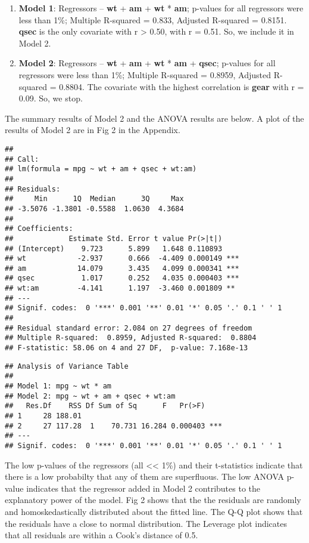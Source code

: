 \documentclass[10pt,]{article}
\begin{document}
\begin{enumerate}
\def\labelenumi{\arabic{enumi}.}
\itemsep1pt\parskip0pt
\item
  \textbf{Model 1}: Regressors -- \textbf{wt} + \textbf{am} +
  \textbf{wt} * \textbf{am}; p-values for all regressors were less than
  1\%; Multiple R-squared = 0.833, Adjusted R-squared = 0.8151.
  \textbf{qsec} is the only covariate with \textbar{}r\textbar{}
  \textgreater{} 0.50, with r = 0.51. So, we include it in Model 2.
\item
  \textbf{Model 2}: Regressors -- \textbf{wt} + \textbf{am} +
  \textbf{wt} * \textbf{am} + \textbf{qsec}; p-values for all regressors
  were less than 1\%; Multiple R-squared = 0.8959, Adjusted R-squared =
  0.8804. The covariate with the highest correlation is \textbf{gear}
  with r = 0.09. So, we stop.
\end{enumerate}

The summary results of Model 2 and the ANOVA results are below. A plot
of the results of Model 2 are in Fig 2 in the Appendix.

\begin{verbatim}
## 
## Call:
## lm(formula = mpg ~ wt + am + qsec + wt:am)
## 
## Residuals:
##     Min      1Q  Median      3Q     Max 
## -3.5076 -1.3801 -0.5588  1.0630  4.3684 
## 
## Coefficients:
##             Estimate Std. Error t value Pr(>|t|)    
## (Intercept)    9.723      5.899   1.648 0.110893    
## wt            -2.937      0.666  -4.409 0.000149 ***
## am            14.079      3.435   4.099 0.000341 ***
## qsec           1.017      0.252   4.035 0.000403 ***
## wt:am         -4.141      1.197  -3.460 0.001809 ** 
## ---
## Signif. codes:  0 '***' 0.001 '**' 0.01 '*' 0.05 '.' 0.1 ' ' 1
## 
## Residual standard error: 2.084 on 27 degrees of freedom
## Multiple R-squared:  0.8959, Adjusted R-squared:  0.8804 
## F-statistic: 58.06 on 4 and 27 DF,  p-value: 7.168e-13
\end{verbatim}

\begin{verbatim}
## Analysis of Variance Table
## 
## Model 1: mpg ~ wt * am
## Model 2: mpg ~ wt + am + qsec + wt:am
##   Res.Df    RSS Df Sum of Sq      F   Pr(>F)    
## 1     28 188.01                                 
## 2     27 117.28  1    70.731 16.284 0.000403 ***
## ---
## Signif. codes:  0 '***' 0.001 '**' 0.01 '*' 0.05 '.' 0.1 ' ' 1
\end{verbatim}

The low p-values of the regressors (all \textless{}\textless{} 1\%) and
their t-statistics indicate that there is a low probabilty that any of
them are superfluous. The low ANOVA p-value indicates that the regressor
added in Model 2 contributes to the explanatory power of the model. Fig
2 shows that the the residuals are randomly and homoskedastically
distributed about the fitted line. The Q-Q plot shows that the residuals
have a close to normal distribution. The Leverage plot indicates that
all residuals are within a Cook's distance of 0.5.
\end{document}
